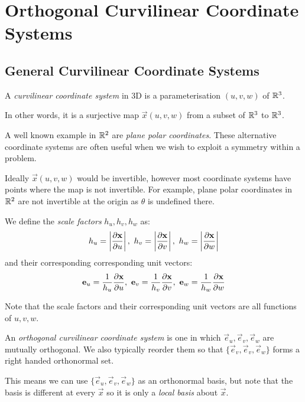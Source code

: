 \documentclass[../main.tex]{subfiles}
\begin{document}
\chapter{Orthogonal Curvilinear Coordinate Systems}
\label{orthoCurvilinear}
\section{General Curvilinear Coordinate Systems}
\begin{definition}
  A \textit{curvilinear coordinate system} in 3D is a parameterisation $(u, v, w)$ of $\mathbb{R}^3$.

  In other words, it is a surjective map $\vec{x}(u, v, w)$ from a subset of $\mathbb{R}^3$ to $\mathbb{R}^3$.
\end{definition}
A well known example in $\mathbb{R}^2$ are \textit{plane polar coordinates}.
These alternative coordinate systems are often useful when we wish to exploit a symmetry within a problem.
\begin{remark}
  Ideally $\vec{x}(u, v, w)$ would be invertible, however most coordinate systems have points where the map is not invertible.
  For example, plane polar coordinates in $\mathbb{R}^2$ are not invertible at the origin as $\theta$ is undefined there.
\end{remark}
\begin{definition}
  We define the \textit{scale factors} $h_u, h_v, h_w$ as:
  \label{scaleFactors}
  \[
    h_u = \abs{\pderiv{\vec{x}}{u}},\ h_v = \abs{\pderiv{\vec{x}}{v}},\ h_w = \abs{\pderiv{\vec{x}}{w}}
  \]
  and their corresponding corresponding unit vectors:
  \[
    \vec{e}_u = \frac{1}{h_u} \pderiv{\vec{x}}{u},\ \vec{e}_v = \frac{1}{h_v} \pderiv{\vec{x}}{v},\ \vec{e}_w = \frac{1}{h_w} \pderiv{\vec{x}}{w}
  \]
\end{definition}
\begin{remark}[Warning]
  Note that the scale factors and their corresponding unit vectors are all functions of $u, v, w$.
\end{remark}
\begin{definition}
  An \textit{orthogonal curvilinear coordinate system} is one in which $\vec{e}_u, \vec{e}_v, \vec{e}_w$ are mutually orthogonal.
  We also typically reorder them so that $\{\vec{e}_v, \vec{e}_v, \vec{e}_w\}$ forms a right handed orthonormal set.
\end{definition}
This means we can use $\{\vec{e}_u, \vec{e}_v, \vec{e}_w\}$ as an orthonormal basis, but note that the basis is different at every $\vec{x}$ so it is only a \textit{local basis} about $\vec{x}$.
\end{document}
